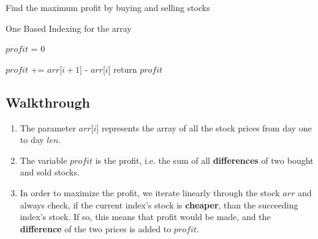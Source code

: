 \documentclass[12pt]{article}
\begin{document}
\begin{algorithm}

\caption{Find the maximum profit by buying and selling stocks}

\begin{algorithmic}[1]
    \Ensure One Based Indexing for the array
    \Statex
 
       
       \Statex
       \State $profit$ = 0
       
 	 	    \State $profit$ += $arr$[$i+1$] - $arr$[$i$]
 	      \EndIf
 	  \EndFor
      \State return $profit$

      \Statex
      \EndFunction
       
    \vskip 0.5in
    \subsection*{Walkthrough}
        \begin{enumerate}
            \item The parameter $arr$[$i$] represents the array of all the stock prices from day one to day $len$.
            \item The variable $profit$ is the profit, i.e. the sum of all \textbf{differences} of two bought and sold stocks.
            
            \item In order to maximize the profit, we iterate linearly through the stock $arr$ and always check, if the current index's stock is \textbf{cheaper}, than the succeeding index's stock. If so, this means that profit would be made, and the \textbf{difference} of the two prices is added to $profit$.
     \end{enumerate}


\end{algorithmic}
\end{algorithm}
\end{document}
